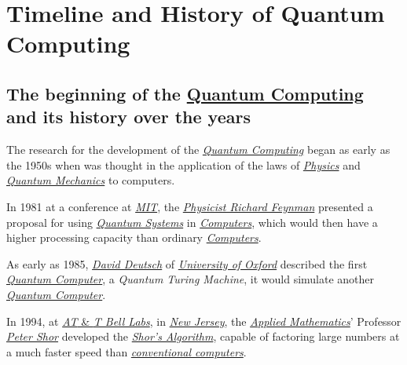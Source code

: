 \documentclass[conference]{IEEEtran}
\begin{document}
\newpage

\section{Timeline and History of Quantum Computing}

\subsection{The beginning of the \href{https://en.wikipedia.org/wiki/Quantum_computing}{Quantum Computing}\\ and its history over the years}\label{AA}

The research for the development of the \href{https://en.wikipedia.org/wiki/Quantum_computing}{\textit{Quantum Computing}} began as early as the 1950s when was thought in the application of the laws of \href{https://en.wikipedia.org/wiki/Physics}{\textit{Physics}} and \href{https://en.wikipedia.org/wiki/Quantum_mechanics}{\textit{Quantum Mechanics}} to computers.

\vspace{4pt}

In 1981 at a conference at \href{https://en.wikipedia.org/wiki/Massachusetts_Institute_of_Technology}{\textit{MIT}}, the \href{https://en.wikipedia.org/wiki/Richard_Feynman}{\textit{Physicist Richard Feynman}} presented a proposal for using \href{https://en.wikipedia.org/wiki/Quantum_system}{\textit{Quantum Systems}} in \href{https://en.wikipedia.org/wiki/Computer}{\textit{Computers}}, which would then have a higher processing capacity than ordinary \href{https://en.wikipedia.org/wiki/Computer}{\textit{Computers}}.\cite{b1}

\vspace{4pt}

As early as 1985, \href{https://en.wikipedia.org/wiki/David_Deutsch}{\textit{David Deutsch}} of \href{https://en.wikipedia.org/wiki/University_of_Oxford}{\textit{University of Oxford}} described the first \href{https://en.wikipedia.org/wiki/Quantum_computing}{\textit{Quantum Computer}}, a \textit{Quantum Turing Machine}, it would simulate another \href{https://en.wikipedia.org/wiki/Quantum_computing}{\textit{Quantum Computer}}.\cite{b2}

\vspace{4pt}

In 1994, at \href{https://en.wikipedia.org/wiki/Bell_Labs}{\textit{AT} \& \textit{T Bell Labs}}, in \href{https://en.wikipedia.org/wiki/New_Jersey}{\textit{New Jersey}}, the \href{https://en.wikipedia.org/wiki/Applied_mathematics}{\textit{Applied Mathematics}}' Professor \href{https://en.wikipedia.org/wiki/Peter_Shor}{\textit{Peter Shor}} developed the \href{https://en.wikipedia.org/wiki/Shor\%27s_algorithm}{\textit{Shor's Algorithm}}, capable of factoring large numbers at a much faster speed than \href{https://en.wikipedia.org/wiki/Von_Neumann_architecture}{\textit{conventional computers}}. \cite{b3}
\end{document}
